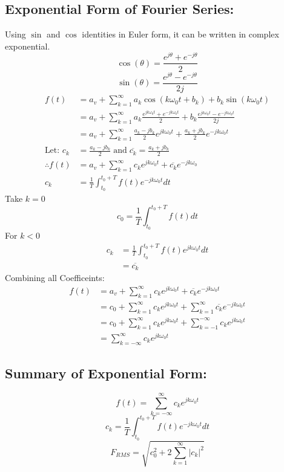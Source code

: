 \documentclass[a5paper]{article}
\begin{document}
	\subsection{Exponential Form of Fourier Series:}
	Using $\sin$ and $\cos$ identities in Euler form, it can be written in complex exponential.
	$$\cos{(\theta)}=\frac{e^{j\theta}+e^{-j\theta}}{2}$$
	$$\sin{(\theta)}=\frac{e^{j\theta}-e^{-j\theta}}{2j}$$
	\begin{align*}
		f(t)&=a_{v}+\sum^{\infty}_{k=1}a_{k}\cos{(k\omega_{0}t+b_{k})}+b_{k}\sin{(k\omega_{0}t)}\\
		&=a_{v}+\sum^{\infty}_{k=1}a_{k}\frac{e^{jk\omega_{0}t}+e^{-jk\omega_{0}t}}{2}+b_{k}\frac{e^{jk\omega_{0}t}-e^{-jk\omega_{0}t}}{2j}\\
		&=a_{v}+\sum^{\infty}_{k=1}\frac{a_{k}-jb_{k}}{2}e^{jk\omega_{0}t}+\frac{a_{k}+jb_{k}}{2}e^{-jk\omega_{0}t}\\
		\text{Let: }c_{k}&=\frac{a_{k}-jb_{k}}{2}\;\text{and}\;\overline{c_{k}}=\frac{a_{k}+jb_{k}}{2}\\
		\therefore f(t)&=a_{v}+\sum^{\infty}_{k=1}c_{k}e^{jk\omega_{0}t}+\overline{c_{k}}e^{-jk\omega_{0}}\\
		c_{k}&=\frac{1}{T}\int^{t_{0}+T}_{t_{0}}f(t)e^{-jk\omega_{0}t}dt
	\end{align*}
	Take $k=0$
	$$c_{0}=\frac{1}{T}\int^{t_{0}+T}_{t_{0}}f(t)dt$$
	For $k<0$
	\begin{align*}
		c_{k}&=\frac{1}{T}\int^{t_{0}+T}_{t_{0}}f(t)e^{jk\omega_{0}t}dt\\
		&=\overline{c_{k}}
	\end{align*}
	Combining all Coefficeints:
	\begin{align*}
		f(t)&=a_{v}+\sum^{\infty}_{k=1}c_{k}e^{jk\omega_{0}t}+\overline{c_{k}}e^{-jk\omega_{0}t}\\
		&=c_{0}+\sum^{\infty}_{k=1}c_{k}e^{jk\omega_{0}t}+\sum^{\infty}_{k=1}\overline{c_{k}}e^{-jk\omega_{0}t}\\
		&=c_{0}+\sum^{\infty}_{k=1}c_{k}e^{jk\omega_{0}t}+\sum^{-\infty}_{k=-1}c_{k}e^{jk\omega_{0}t}\\
		&=\sum^{\infty}_{k=-\infty}c_{k}e^{jk\omega_{0}t}
	\end{align*}
	\subsection{Summary of Exponential Form:}
	$$f(t)=\sum^{\infty}_{k=-\infty}c_{k}e^{jk\omega_{0}t}$$
	$$c_{k}=\frac{1}{T}\int^{t_{0}+T}_{t_{0}}f(t)e^{-jk\omega_{0}t}dt$$
	$$F_{RMS}=\sqrt{c_{0}^{2}+2\sum^{\infty}_{k=1}|c_{k}|^{2}}$$
\end{document}
